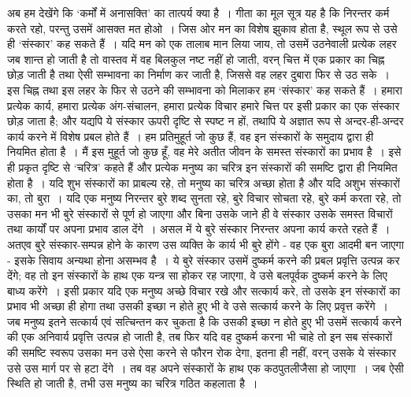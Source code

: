 अब हम देखेंगे कि ‘कर्मों में अनासक्ति’ का तात्पर्य क्या है~। गीता का मूल सूत्र यह है कि निरन्तर कर्म करते रहो, परन्तु उसमें आसक्त मत होओ~। जिस ओर मन का विशेष झुकाव होता है, स्थूल रूप से उसे ही ‘संस्कार’ कह सकते हैं~। यदि मन को एक तालाब मान लिया जाय, तो उसमें उठनेवाली प्रत्येक लहर जब शान्त हो जाती है तो वास्तव में वह बिलकुल नष्ट नहीं हो जाती, वरन् चित्त में एक प्रकार का चिह्न छोड़ जाती है तथा ऐसी सम्भावना का निर्माण कर जाती है, जिससे वह लहर दुबारा फिर से उठ सके~। इस चिह्न तथा इस लहर के फिर से उठने की सम्भावना को मिलाकर हम ‘संस्कार’ कह सकते हैं~। हमारा प्रत्येक कार्य, हमारा प्रत्येक अंग-संचालन, हमारा प्रत्येक विचार हमारे चित्त पर इसी प्रकार का एक संस्कार छोड़ जाता है; और यद्यपि ये संस्कार ऊपरी दृष्टि से स्पष्ट न हों, तथापि ये अज्ञात रूप से अन्दर-ही-अन्दर कार्य करने में विशेष प्रबल होते हैं~। हम प्रतिमुहूर्त जो कुछ हैं, वह इन संस्कारों के समुदाय द्वारा ही नियमित होता है~। मैं इस मुहूर्त जो कुछ हूँ, वह मेरे अतीत जीवन के समस्त संस्कारों का प्रभाव है~। इसे ही प्रकृत दृष्टि से ‘चरित्र’ कहते हैं और प्रत्येक मनुष्य का चरित्र इन संस्कारों की समष्टि द्वारा ही नियमित होता है~। यदि शुभ संस्कारों का प्राबल्य रहे, तो मनुष्य का चरित्र अच्छा होता है और यदि अशुभ संस्कारों का, तो बुरा~। यदि एक मनुष्य निरन्तर बुरे शब्द सुनता रहे, बुरे विचार सोचता रहे, बुरे कर्म करता रहे, तो उसका मन भी बुरे संस्कारों से पूर्ण हो जाएगा और बिना उसके जाने ही वे संस्कार उसके समस्त विचारों तथा कार्यों पर अपना प्रभाव डाल देंगे~। असल में ये बुरे संस्कार निरन्तर अपना कार्य करते रहते हैं~। अतएव बुरे संस्कार-सम्पन्न होने के कारण उस व्यक्ति के कार्य भी बुरे होंगे - वह एक बुरा आदमी बन जाएगा - इसके सिवाय अन्यथा होना असम्भव है~। ये बुरे संस्कार उसमें दुष्कर्म करने की प्रबल प्रवृत्ति उत्पन्न कर देंगे; वह तो इन संस्कारों के हाथ एक यन्त्र सा होकर रह जाएगा, वे उसे बलपूर्वक दुष्कर्म करने के लिए बाध्य करेंगे~। इसी प्रकार यदि एक मनुष्य अच्छे विचार रखे और सत्कार्य करे, तो उसके इन संस्कारों का प्रभाव भी अच्छा ही होगा तथा उसकी इच्छा न होते हुए भी वे उसे सत्कार्य करने के लिए प्रवृत्त करेंगे~। जब मनुष्य इतने सत्कार्य एवं सत्चिन्तन कर चुकता है कि उसकी इच्छा न होते हुए भी उसमें सत्कार्य करने की एक अनिवार्य प्रवृत्ति उत्पन्न हो जाती है, तब फिर यदि वह दुष्कर्म करना भी चाहे तो इन सब संस्कारों की समष्टि स्वरूप उसका मन उसे ऐसा करने से फौरन रोक देगा, इतना ही नहीं, वरन् उसके ये संस्कार उसे उस मार्ग पर से हटा देंगे~। तब वह अपने संस्कारों के हाथ एक कठपुतलीजैसा हो जाएगा~। जब ऐसी स्थिति हो जाती है, तभी उस मनुष्य का चरित्र गठित कहलाता है~।

